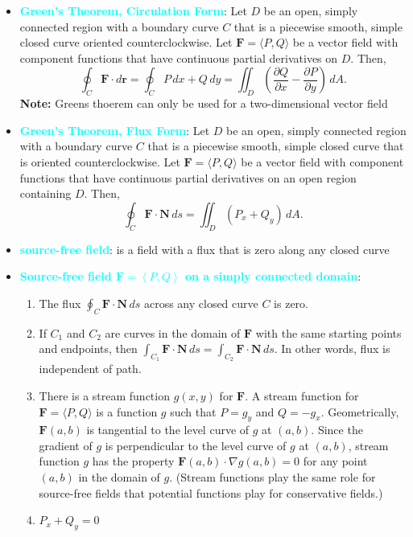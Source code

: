 \documentclass{report}
\begin{document}
\begin{itemize}
\[            \]
        \item \textbf{\textcolor{cyan}{Green’s Theorem, Circulation Form}}:
            Let \( D \) be an open, simply connected region with a boundary curve \( C \) that is a piecewise smooth, simple closed curve oriented counterclockwise. Let \( \mathbf{F} = \langle P, Q \rangle \) be a vector field with component functions that have continuous partial derivatives on \( D \). Then,
            \[
                \oint_C \mathbf{F} \cdot d\mathbf{r} = \oint_C P \, dx + Q \, dy = \iint_D \left( \frac{\partial Q}{\partial x} - \frac{\partial P}{\partial y} \right) \, dA.
            \]
            \bigbreak \noindent 
            \textbf{Note:} Greens thoerem can only be used for a two-dimensional vector field
        \item \textbf{\textcolor{cyan}{Green’s Theorem, Flux Form}}:
            Let \( D \) be an open, simply connected region with a boundary curve \( C \) that is a piecewise smooth, simple closed curve that is oriented counterclockwise. Let \( \mathbf{F} = \langle P, Q \rangle \) be a vector field with component functions that have continuous partial derivatives on an open region containing \( D \). Then,
            \[
                \oint_C \mathbf{F} \cdot \mathbf{N} \, ds = \iint_D \left( P_x + Q_y \right) \, dA.
            \]
        \item \textbf{\textcolor{cyan}{source-free field}}: is a field with a flux that is zero along any closed curve
        \item \textbf{\textcolor{cyan}{Source-free field $\mathbf{F} =\left\langle P,Q \right\rangle$ on a simply connected domain}}:
            \begin{enumerate}
                \item The flux \(\oint_C \mathbf{F} \cdot \mathbf{N} \, ds\) across any closed curve \( C \) is zero.
                \item If \( C_1 \) and \( C_2 \) are curves in the domain of \( \mathbf{F} \) with the same starting points and endpoints, then \(\int_{C_1} \mathbf{F} \cdot \mathbf{N} \, ds = \int_{C_2} \mathbf{F} \cdot \mathbf{N} \, ds\). In other words, flux is independent of path.
                \item There is a stream function \( g(x, y) \) for \( \mathbf{F} \). A stream function for \( \mathbf{F} = \langle P, Q \rangle \) is a function \( g \) such that \( P = g_y \) and \( Q = -g_x \). Geometrically, \( \mathbf{F}(a, b) \) is tangential to the level curve of \( g \) at \( (a, b) \). Since the gradient of \( g \) is perpendicular to the level curve of \( g \) at \( (a, b) \), stream function \( g \) has the property \( \mathbf{F}(a, b) \cdot \nabla g(a, b) = 0 \) for any point \( (a, b) \) in the domain of \( g \). (Stream functions play the same role for source-free fields that potential functions play for conservative fields.)
                \item \( P_x + Q_y = 0 \)
            \end{enumerate}
        \end{itemize}
\end{document}
